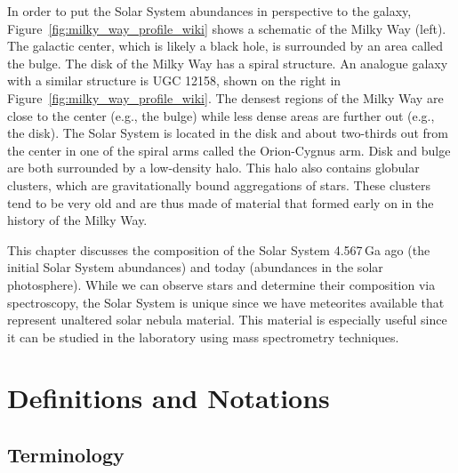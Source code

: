 In order to put the Solar System abundances in perspective to the galaxy, Figure~\ref{fig:milky_way_profile_wiki} shows a schematic of the Milky Way (left). The galactic center, which is likely a black hole, is surrounded by an area called the bulge. The disk of the Milky Way has a spiral structure. An analogue galaxy with a similar structure is UGC 12158, shown on the right in Figure~\ref{fig:milky_way_profile_wiki}. The densest regions of the Milky Way are close to the center (e.g., the bulge) while less dense areas are further out (e.g., the disk). The Solar System is located in the disk and about two-thirds out from the center in one of the spiral arms called the Orion-Cygnus arm. Disk and bulge are both surrounded by a low-density halo. This halo also contains globular clusters, which are gravitationally bound aggregations of stars. These clusters tend to be very old and are thus made of material that formed early on in the history of the Milky Way.

This chapter discusses the composition of the Solar System 4.567\,Ga ago (the initial Solar System abundances) and today (abundances in the solar photosphere). While we can observe stars and determine their composition via spectroscopy, the Solar System is unique since we have meteorites available that represent unaltered solar nebula material. This material is especially useful since it can be studied in the laboratory using mass spectrometry techniques. 



\section{Definitions and Notations}

\subsection{Terminology}

